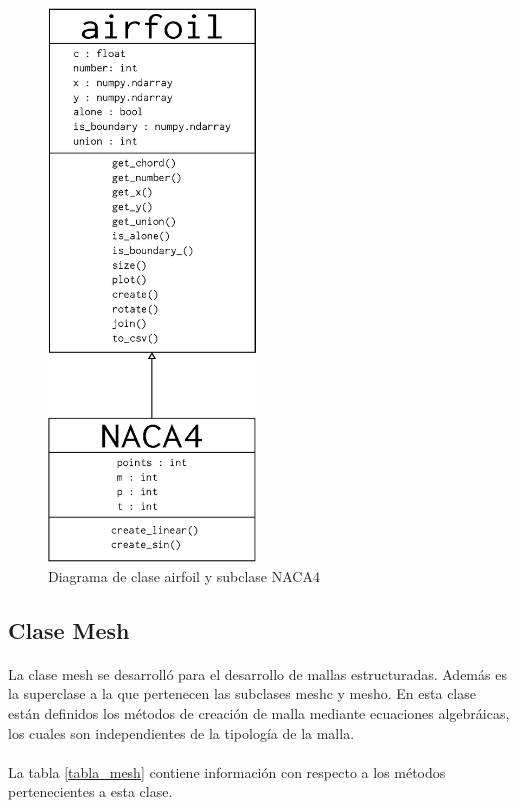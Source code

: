 \documentclass[letterpaper, openright, 12pt]{book}
\begin{document}
    \begin{figure}[htbp!]
        \centering
        \includegraphics[keepaspectratio, width=55mm]{./Imagenes/airfoil_class}
        \caption[Diagrama de clase airfoil y subclase NACA4]{Diagrama de clase airfoil y subclase
        NACA4}
        \label{airfoil_class}
    \end{figure}


    \subsection{Clase Mesh}
    \paragraph*{}
        La clase mesh se desarrolló para el desarrollo de mallas estructuradas.
        Además es la superclase a la que pertenecen las subclases
        mesh\textunderscore c y mesh\textunderscore o. En esta clase están
        definidos los métodos de creación de malla mediante ecuaciones
        algebráicas, los cuales son independientes de la tipología de la malla.

    \paragraph*{}
        La tabla \ref{tabla_mesh} contiene información con respecto a los
        métodos pertenecientes a esta clase.
\end{document}

